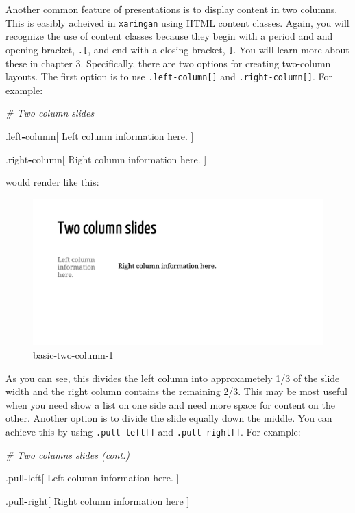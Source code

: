 \documentclass[
]{book}
\newenvironment{Shaded}{\begin{snugshade}}{\end{snugshade}}
\newcommand{\CommentTok}[1]{\textcolor[rgb]{0.37,0.37,0.37}{\textit{#1}}}
\newcommand{\NormalTok}[1]{#1}
\newcommand{\OperatorTok}[1]{\textcolor[rgb]{0.43,0.43,0.43}{\textbf{#1}}}
\begin{document}
Another common feature of presentations is to display content in two columns. This is easibly acheived in \texttt{xaringan} using HTML content classes. Again, you will recognize the use of content classes because they begin with a period and and opening bracket, \texttt{.{[}}, and end with a closing bracket, \texttt{{]}}. You will learn more about these in chapter 3. Specifically, there are two options for creating two-column layouts. The first option is to use \texttt{.left-column{[}{]}} and \texttt{.right-column{[}{]}}. For example:

\begin{Shaded}
\begin{Highlighting}[]
\CommentTok{# Two column slides}

\NormalTok{.left}\OperatorTok{-}\NormalTok{column[}
\NormalTok{Left column information here.}
\NormalTok{]}

\NormalTok{.right}\OperatorTok{-}\NormalTok{column[}
\NormalTok{Right column information here.}
\NormalTok{]}
\end{Highlighting}
\end{Shaded}

would render like this:

\begin{figure}
\centering
\includegraphics{img/02_basics-two-column_1.png}
\caption{basic-two-column-1}
\end{figure}

As you can see, this divides the left column into approxametely 1/3 of the slide width and the right column contains the remaining 2/3. This may be most useful when you need show a list on one side and need more space for content on the other. Another option is to divide the slide equally down the middle. You can achieve this by using \texttt{.pull-left{[}{]}} and \texttt{.pull-right{[}{]}}. For example:

\begin{Shaded}
\begin{Highlighting}[]
\CommentTok{# Two columns slides (cont.)}

\NormalTok{.pull}\OperatorTok{-}\NormalTok{left[}
\NormalTok{Left column information here.}
\NormalTok{]}

\NormalTok{.pull}\OperatorTok{-}\NormalTok{right[}
\NormalTok{Right column information here}
\NormalTok{]}
\end{Highlighting}
\end{Shaded}
\end{document}
